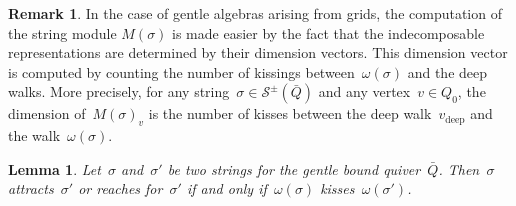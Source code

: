 \documentclass{memo-l}
\newtheorem{lemma}[theorem]{Lemma}
\theoremstyle{definition}
\newtheorem{remark}[theorem]{Remark}
\newcommand{\strings}{\mathcal{S}} %
\newcommand{\deep}{\mathrm{deep}} %
\begin{document}
\begin{remark}
In the case of gentle algebras arising from grids, the computation of the string module $M(\sigma)$ is made easier by the fact that the indecomposable representations are determined by their dimension vectors.
This dimension vector is computed by counting the number of kissings between~$\omega(\sigma)$ and the deep walks.
More precisely, for any string~$\sigma \in \strings^\pm(\bar Q)$ and any vertex~$v \in Q_0$, the dimension of~$M(\sigma)_v$ is the number of kisses between the deep walk~$v_\deep$ and the walk~$\omega(\sigma)$.
\end{remark}


\begin{lemma}\label{lem: attract or dance vs kiss}
Let~$\sigma$ and~$\sigma'$ be two strings for the gentle bound quiver~$\bar Q$.
Then~$\sigma$ attracts~$\sigma'$ or reaches for~$\sigma'$ if and only if~$\omega(\sigma)$ kisses~$\omega(\sigma')$.
\end{lemma}
\end{document}
